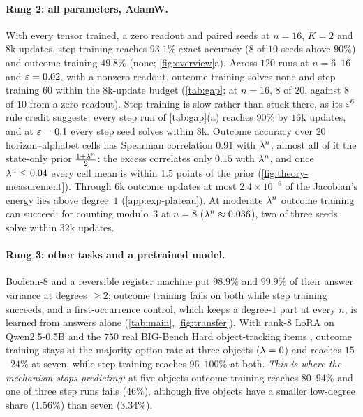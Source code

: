 \paragraph{Rung 2: all parameters, AdamW.} With every tensor trained, a zero readout and paired seeds at $n=16$, $K=2$ and $8$k
updates, step training reaches $93.1\%$ exact accuracy ($8$ of $10$ seeds above $90\%$) and outcome training $49.8\%$ (none;
\cref{fig:overview}a). Across $120$ runs at $n=6$--$16$ and $\varepsilon=0.02$, with a nonzero readout, outcome training solves none and step training $60$ within the $8$k-update budget
(\cref{tab:gap}; at $n=16$, $8$ of $20$, against $8$ of $10$ from a zero readout). Step training is slow rather than stuck there, as its $\varepsilon^6$ rule credit suggests: every step run of
\cref{tab:gap}(a) reaches $90\%$ by $16$k updates, and at $\varepsilon=0.1$ every step seed solves within $8$k. Outcome
accuracy over $20$ horizon--alphabet cells has Spearman correlation $0.91$ with $\lambda^n$, almost all of it the state-only prior
$\frac{1+\lambda^n}{2}$: the excess correlates only $0.15$ with $\lambda^n$, and once $\lambda^n\le0.04$ every cell mean is within $1.5$
points of the prior (\cref{fig:theory-measurement}). Through $6$k outcome updates at most $2.4\times10^{-6}$ of the Jacobian's energy
lies above degree~$1$ (\cref{app:exp-plateau}). At moderate $\lambda^n$ outcome training can succeed: for counting modulo~$3$ at $n=8$
($\lambda^n\approx0.036$), two of three seeds solve within $32$k updates.

\paragraph{Rung 3: other tasks and a pretrained model.} Boolean-8 and a reversible register machine put $98.9\%$ and $99.9\%$ of their
answer variance at degrees $\ge2$; outcome training fails on both while step training succeeds, and a first-occurrence control, which
keeps a degree-$1$ part at every $n$, is learned from answers alone (\cref{tab:main}, \cref{fig:transfer}). With rank-8 LoRA on
Qwen2.5-0.5B and the $750$ real BIG-Bench Hard object-tracking items \citep{suzgun2022challenging}, outcome training stays at the
majority-option rate at three objects ($\lambda=0$) and reaches $15$--$24\%$ at seven, while step training reaches $96$--$100\%$ at both.
\emph{This is where the mechanism stops predicting:} at five objects outcome training reaches $80$--$94\%$ and one of three step runs fails
($46\%$), although five objects have a smaller low-degree share ($1.56\%$) than seven ($3.34\%$).

